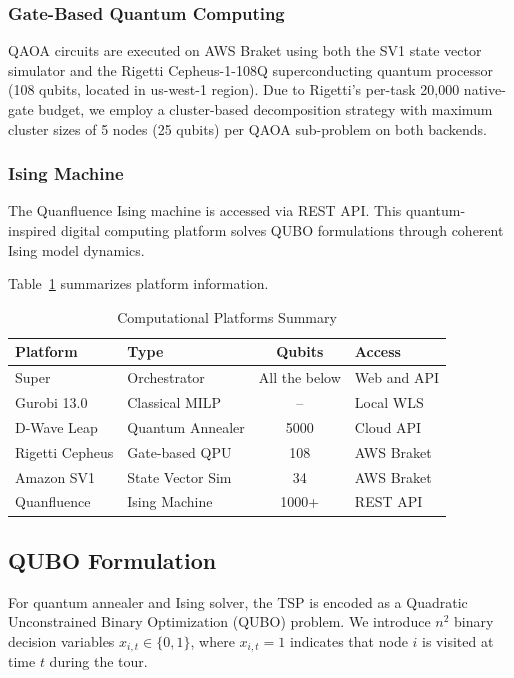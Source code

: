 \documentclass[conference]{IEEEtran}
\begin{document}
\subsubsection{Gate-Based Quantum Computing}
QAOA circuits are executed on AWS Braket using both the SV1 state vector simulator and the Rigetti Cepheus-1-108Q superconducting quantum processor (108 qubits, located in us-west-1 region). Due to Rigetti's per-task 20{,}000 native-gate budget, we employ a cluster-based decomposition strategy with maximum cluster sizes of 5 nodes (25 qubits) per QAOA sub-problem on both backends.

\subsubsection{Ising Machine}
The Quanfluence Ising machine is accessed via REST API. This quantum-inspired digital computing platform solves QUBO formulations through coherent Ising model dynamics.

Table~\ref{tab:platforms} summarizes platform information.

\begin{table}[htbp]
\caption{Computational Platforms Summary}
\begin{center}
\begin{tabular}{|l|l|c|l|}
\hline
\textbf{Platform} & \textbf{Type} & \textbf{Qubits} & \textbf{Access} \\
\hline
Super & Orchestrator & All the below & Web and API \\
\hline
Gurobi 13.0 & Classical MILP & -- & Local WLS \\
\hline
D-Wave Leap & Quantum Annealer & 5000 & Cloud API \\
\hline
Rigetti Cepheus & Gate-based QPU & 108 & AWS Braket \\
\hline
Amazon SV1 & State Vector Sim & 34 & AWS Braket \\
\hline
Quanfluence & Ising Machine & 1000+ & REST API \\
\hline
\end{tabular}
\label{tab:platforms}
\end{center}
\end{table}

\subsection{QUBO Formulation}

For quantum annealer and Ising solver, the TSP is encoded as a Quadratic Unconstrained Binary Optimization (QUBO) problem. We introduce $n^2$ binary decision variables $x_{i,t} \in \{0,1\}$, where $x_{i,t} = 1$ indicates that node $i$ is visited at time $t$ during the tour.
\end{document}
